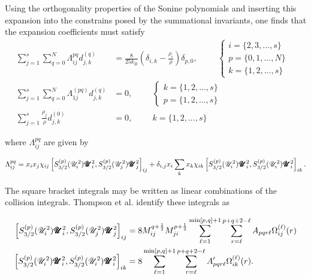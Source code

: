 Using the orthogonality properties of the Sonine polynomials and inserting this expansion into the constrains posed by the summational invariants, one finds that the expansion coefficients must satisfy 
\begin{equation}
    \begin{split}
        \sum_{j=1}^s \sum_{q = 0}^{N} \Lambda_{ij}^{pq}d_{j,k}^{(q)} &= \frac{8}{25 k_B}\left(\delta_{i,k} - \frac{\rho_i}{\rho}\right)\delta_{p,0}, \hspace{1cm}
        \begin{cases}
            i = \{2, 3, ..., s\}&\\
            p = \{0, 1, ..., N\}& \\
            k = \{1, 2, ..., s\}&
        \end{cases}
        \\
        \sum_{j=1}^s \sum_{q=0}^N \Lambda_{1j}^{(pq)} d_{j,k}^{(q)} &= 0, \hspace{1cm}
        \begin{cases}
            k = \{1, 2, ..., s\}&\\
            p = \{1, 2, ..., s\}&
        \end{cases}
        \\
        \sum_{j = 1}^s \frac{\rho_j}{\rho} d_{j,k}^{(0)} &= 0, \hspace{1cm} k = \{1, 2, ..., s\}
    \end{split}
    \label{eq:diffusion_eq_set}
\end{equation}

where $\Lambda_{ij}^{pq}$ are given by

\begin{equation}
    \Lambda_{ij}^{pq} = x_i x_j \chi_{ij} \left[ S_{3/2}^{(p)}(\mathscr{U}_i^2)\pmb{\mathscr{U}}_i^2, S_{3/2}^{(p)}(\mathscr{U}_j^2)\pmb{\mathscr{U}}_j^{2}\right]_{ij} + \delta_{i, j} x_i \sum_{k} x_{k} \chi_{ik} \left[ S_{3/2}^{(p)}(\mathscr{U}_i^2)\pmb{\mathscr{U}}_i^2, S_{3/2}^{(p)}(\mathscr{U}_i^2)\pmb{\mathscr{U}}_i^{2}\right]_{ik}.
    \label{eq:lambda_ijpq}
\end{equation}

The square bracket integrals may be written as linear combinations of the collision integrals.\cite{kinetics_1} Thompson et al. identify these integrals as

\begin{equation}
    \begin{split}
        \left[ S_{3/2}^{(p)}(\mathscr{U}_i^2)\pmb{\mathscr{U}}_i^2, S_{3/2}^{(p)}(\mathscr{U}_j^2)\pmb{\mathscr{U}}_j^{2}\right]_{ij} &= 8 M_{ij}^{q + \frac{1}{2}} M_{ji}^{p + \frac{1}{2}} \sum_{\ell = 1}^{\min [p, q] + 1} \sum_{r = \ell}^{p + q + 2 - \ell} A_{pqr \ell} \Omega_{ij}^{(\ell)}(r) \\
        \left[ S_{3/2}^{(p)}(\mathscr{U}_i^2)\pmb{\mathscr{U}}_i^2, S_{3/2}^{(p)}(\mathscr{U}_i^2)\pmb{\mathscr{U}}_i^{2}\right]_{ik} &= 8 \sum_{\ell = 1}^{\min [p, q] + 1} \sum_{r = \ell}^{p + q + 2 - \ell} A_{pqr \ell}' \Omega_{ik}^{(\ell)}(r).
    \end{split}
\end{equation}

